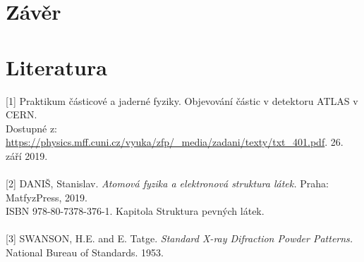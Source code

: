 \documentclass[10pt,a4paper]{article}
\newcommand{\°}{\degree}
\begin{document}
\section{Závěr}

\section{Literatura}
[1] Praktikum částicové a jaderné fyziky. Objevování částic v detektoru ATLAS v CERN. \\ Dostupné z: \url{https://physics.mff.cuni.cz/vyuka/zfp/_media/zadani/texty/txt_401.pdf}. 26. září 2019.
\\\\
{}[2] DANIŠ, Stanislav. \textit{Atomová fyzika a elektronová struktura látek.} Praha: MatfyzPress, 2019. \\ ISBN 978-80-7378-376-1. Kapitola Struktura pevných látek.
\\\\
{}[3] SWANSON, H.E. and E. Tatge. \textit{Standard X-ray Difraction Powder Patterns.} National Bureau of Standards. 1953.
\end{document}
